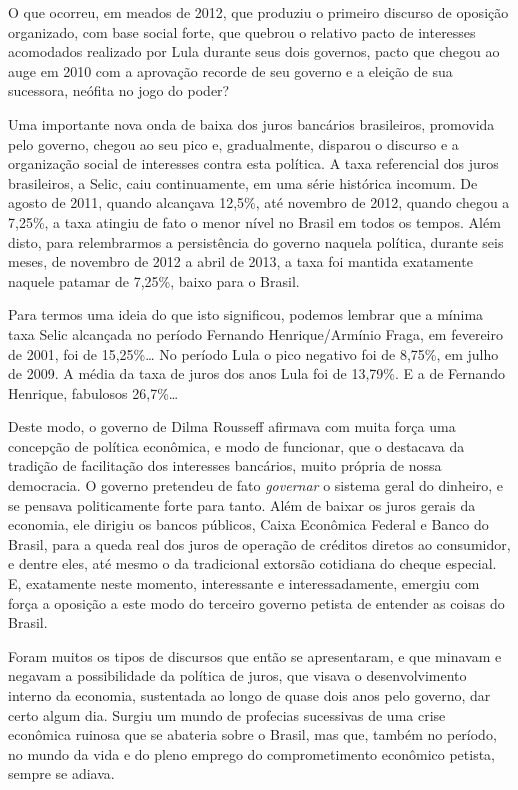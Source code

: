 O que ocorreu, em meados de 2012, que produziu o primeiro discurso de
oposição organizado, com base social forte, que quebrou o relativo pacto
de interesses acomodados realizado por Lula durante seus dois governos,
pacto que chegou ao auge em 2010 com a aprovação recorde de seu governo
e a eleição de sua sucessora, neófita no jogo do poder?

Uma importante nova onda de baixa dos juros bancários brasileiros,
promovida pelo governo, chegou ao seu pico e, gradualmente, disparou o
discurso e a organização social de interesses contra esta política. A
taxa referencial dos juros brasileiros, a Selic, caiu continuamente, em
uma série histórica incomum. De agosto de 2011, quando alcançava 12,5\%,
até novembro de 2012, quando chegou a 7,25\%, a taxa atingiu de fato o
menor nível no Brasil em todos os tempos. Além disto, para relembrarmos
a persistência do governo naquela política, durante seis meses, de
novembro de 2012 a abril de 2013, a taxa foi mantida exatamente naquele
patamar de 7,25\%, baixo para o Brasil.

Para termos uma ideia do que isto significou, podemos lembrar que a
mínima taxa Selic alcançada no período Fernando Henrique/Armínio Fraga,
em fevereiro de 2001, foi de 15,25\%… No período Lula o pico negativo
foi de 8,75\%, em julho de 2009. A média da taxa de juros dos anos Lula
foi de 13,79\%. E a de Fernando Henrique, fabulosos 26,7\%…

Deste modo, o governo de Dilma Rousseff afirmava com muita força uma
concepção de política econômica, e modo de funcionar, que o destacava da
tradição de facilitação dos interesses bancários, muito própria de nossa
democracia. O governo pretendeu de fato \emph{governar} o sistema geral
do dinheiro, e se pensava politicamente forte para tanto. Além de baixar
os juros gerais da economia, ele dirigiu os bancos públicos, Caixa
Econômica Federal e Banco do Brasil, para a queda real dos juros de
operação de créditos diretos ao consumidor, e dentre eles, até mesmo o
da tradicional extorsão cotidiana do cheque especial. E, exatamente
neste momento, interessante e interessadamente, emergiu com força a
oposição a este modo do terceiro governo petista de entender as coisas
do Brasil.

Foram muitos os tipos de discursos que então se apresentaram, e que
minavam e negavam a possibilidade da política de juros, que visava o
desenvolvimento interno da economia, sustentada ao longo de quase dois
anos pelo governo, dar certo algum dia. Surgiu um mundo de profecias
sucessivas de uma crise econômica ruinosa que se abateria sobre o
Brasil, mas que, também no período, no mundo da vida e do pleno emprego
do comprometimento econômico petista, sempre se adiava.

